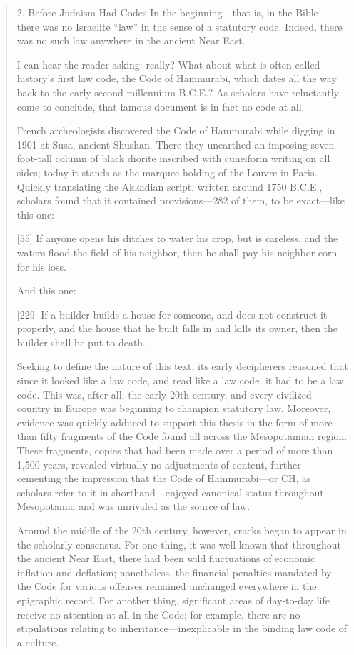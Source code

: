 \documentclass[11pt]{article}
\begin{document}
\begin{quote}
2. Before Judaism Had Codes
In the beginning—that is, in the Bible—there was no Israelite “law” in the sense of a statutory code. Indeed, there was no such law anywhere in the ancient Near East.

I can hear the reader asking: really? What about what is often called history’s first law code, the Code of Hammurabi, which dates all the way back to the early second millennium B.C.E.? As scholars have reluctantly come to conclude, that famous document is in fact no code at all.

French archeologists discovered the Code of Hammurabi while digging in 1901 at Susa, ancient Shushan. There they unearthed an imposing seven-foot-tall column of black diorite inscribed with cuneiform writing on all sides; today it stands as the marquee holding of the Louvre in Paris. Quickly translating the Akkadian script, written around 1750 B.C.E., scholars found that it contained provisions—282 of them, to be exact—like this one:

[55] If anyone opens his ditches to water his crop, but is careless, and the waters flood the field of his neighbor, then he shall pay his neighbor corn for his loss.

And this one:

[229] If a builder builds a house for someone, and does not construct it properly, and the house that he built falls in and kills its owner, then the builder shall be put to death.

Seeking to define the nature of this text, its early decipherers reasoned that since it looked like a law code, and read like a law code, it had to be a law code. This­ was, after all, the early 20th century, and every civilized country in Europe was beginning to champion statutory law. Moreover, evidence was quickly adduced to support this thesis in the form of more than fifty fragments of the Code found all across the Mesopotamian region. These fragments, copies that had been made over a period of more than 1,500 years, revealed virtually no adjustments of content, further cementing the impression that the Code of Hammurabi—or CH, as scholars refer to it in shorthand—enjoyed canonical status throughout Mesopotamia and was unrivaled as the source of law.

Around the middle of the 20th century, however, cracks began to appear in the scholarly consensus. For one thing, it was well known that throughout the ancient Near East, there had been wild fluctuations of economic inflation and deflation; nonetheless, the financial penalties mandated by the Code for various offenses remained unchanged everywhere in the epigraphic record. For another thing, significant areas of day-to-day life receive no attention at all in the Code; for example, there are no stipulations relating to inheritance—inexplicable in the binding law code of a culture. 


\end{quote}
\end{document}
